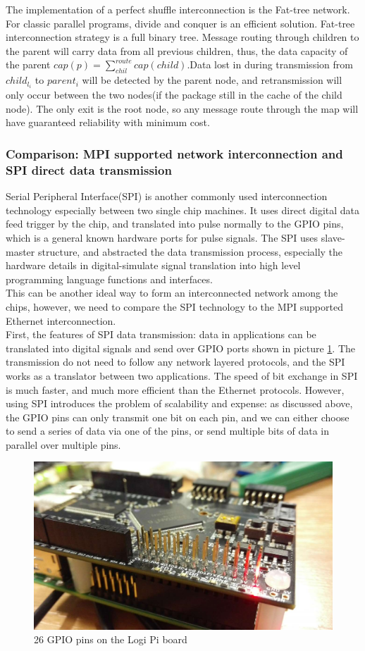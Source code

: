 \documentclass[11pt,openright,a4paper]{report}
\begin{document}
The implementation of a perfect shuffle interconnection is the Fat-tree network. For classic parallel programs, divide and conquer is an efficient solution\cite{aho1974design}. Fat-tree interconnection strategy is a full binary tree. Message routing through children to the parent will carry data from all previous children, thus, the data capacity of the parent $cap(p)=\sum_{chil}^{route}cap(child)$.Data lost in during transmission from $child_{l_{i}}$ to $parent_{i}$ will be detected by the parent node, and retransmission will only occur between the two nodes(if the package still in the cache of the child node). The only exit is the root node, so any message route through the map will have guaranteed reliability with minimum cost.

\subsubsection{Comparison: MPI supported network interconnection and SPI direct data transmission}
Serial Peripheral Interface(SPI) is another commonly used interconnection technology especially between two single chip machines\cite{junger2007method}. It uses direct digital data feed trigger by the chip, and translated into pulse normally to the GPIO pins, which is a general known hardware ports for pulse signals\cite{lin2008transmission}. The SPI uses slave-master structure, and abstracted the data transmission process, especially the hardware details in digital-simulate signal translation into high level programming language functions and interfaces.\\
This can be another ideal way to form an interconnected network among the chips, however, we need to compare the SPI technology to the MPI supported Ethernet interconnection.\\
First, the features of SPI data transmission: data in applications can be translated into digital signals and send over GPIO ports shown in picture \ref{fig:GPIOpin}. The transmission do not need to follow any network layered protocols, and the SPI works as a translator between two applications. The speed of bit exchange in SPI is much faster, and much more efficient than the Ethernet protocols. However, using SPI introduces the problem of scalability and expense: as discussed above, the GPIO pins can only transmit one bit on each pin, and we can either choose to send a series of data via one of the pins, or send multiple bits of data in parallel over multiple pins.\\
\begin{figure}[H]
	\centering
	\includegraphics[width=0.7\linewidth]{picture/photo/GPIOpin}
	\caption{26 GPIO pins on the Logi Pi board}
	\label{fig:GPIOpin}
\end{figure}
\end{document}
